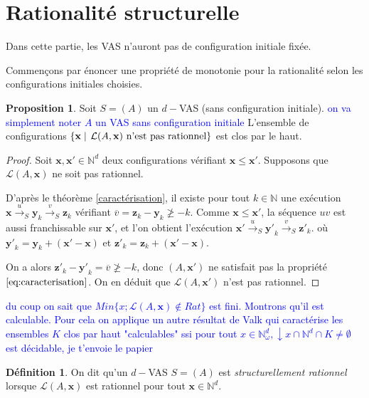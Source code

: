 \documentclass[a4paper,final]{article}
\theoremstyle{definition}
\newtheorem{Definition}[Theorem]{Définition}
\newtheorem{Proposition}[Theorem]{Proposition}
\let\leq\leqslant
\let\geq\geqslant
\newcommand{\alain}[1]{\textcolor{blue}{#1}}
\newcommand{\set}[2]{\left\{#1\mathrel{\left|\vphantom{#1}\vphantom{#2}\right.}#2\right\}}
\newcommand{\N}{\ensuremath{\mathbb{N}}}
\newcommand{\lang}{\ensuremath{\mathcal{L}}}
\newcommand{\trans}[2]{\ensuremath{\stackrel{#1}{\longrightarrow}_{#2}}}
\newcommand{\vect}[1]{\ensuremath{\mathbf{#1}}}
\newcommand{\valeur}[1]{\ensuremath{\overline{#1}}}
\begin{document}

\section{Rationalité structurelle}

Dans cette partie, les VAS n'auront pas de configuration initiale fixée.

Commençons par énoncer une propriété de monotonie pour la rationalité selon les configurations initiales choisies.

\begin{Proposition}\label{monotonie_rationnel}
Soit $S=(A)$ un $d-$VAS (sans configuration initiale).
\alain{on va simplement noter $A$ un VAS sans configuration initiale}
L'ensemble de configurations $\set{\vect{x}}{\lang(A,\vect{x}) \text{ n'est pas rationnel}}$ est clos par le haut.
\end{Proposition}

\begin{proof}
Soit $\vect{x},\vect{x'}\in\N^d$ deux configurations vérifiant $\vect{x} \leq \vect{x'}$.
Supposons que $\lang(A,\vect{x})$ ne soit pas rationnel.

D'après le théorème \ref{caractérisation}, il existe pour tout $k\in\N$ une exécution $\vect{x} \trans{u}{S} \vect{y}_k \trans{v}{S} \vect{z}_k$ vérifiant $\valeur{v} = \vect{z}_k - \vect{y}_k \not\geq -k$.
Comme $\vect{x}\leq\vect{x'}$, la séquence $uv$ est aussi franchissable sur $\vect{x'}$, et l'on obtient l'exécution $\vect{x'} \trans{u}{S} \vect{y'}_k \trans{v}{S} \vect{z'}_k$.
où $\vect{y'}_k = \vect{y}_k + (\vect{x'} - \vect{x})$ et $\vect{z'}_k = \vect{z}_k + (\vect{x'} - \vect{x})$.

On a alors $\vect{z'}_k - \vect{y'}_k = \valeur{v} \not\geq -k$, donc $(A,\vect{x'})$ ne satisfait pas la propriété $\eqref{eq:caracterisation}$.
On en déduit que $\lang(A,\vect{x'})$ n'est pas rationnel.
\end{proof}

\alain{du coup on sait que $Min\{x; \lang(A,\vect{x}) \notin Rat\}$ est fini. Montrons qu'il est calculable. Pour cela on applique un autre résultat de Valk qui caractérise les ensembles $K$ clos par haut "calculables" ssi pour tout $x \in \N_{\omega}^d, \downarrow x \cap \N^d \cap K \neq \emptyset$ est décidable, je t'envoie le papier}
\begin{Definition}
On dit qu'un $d-$VAS $S = (A)$ est \emph{structurellement rationnel} lorsque $\lang(A,\vect{x})$ %
est rationnel pour tout  $\vect{x}\in\N^d$.
\end{Definition}
\end{document}
